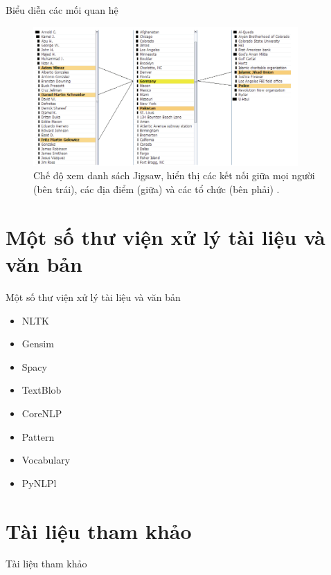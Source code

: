 \documentclass[10pt]{beamer}
\theoremstyle{remark}
\theoremstyle{definition}
\begin{document}
\begin{frame}{Biểu diễn các mối quan hệ}
	\begin{figure}[h!]
        \centering
        \includegraphics[width=0.9\textwidth]{20.png}
        \caption{Chế độ xem danh sách Jigsaw, hiển thị các kết nối giữa mọi người (bên trái), các địa điểm (giữa) và các tổ chức (bên phải) \cite{155}.}
        \label{fig:20}
    \end{figure}
\end{frame}

\section{Một số thư viện xử lý tài liệu và văn bản}

\begin{frame}{Một số thư viện xử lý tài liệu và văn bản}
	\begin{itemize}
		\item NLTK
		\item Gensim
		\item Spacy
		\item TextBlob
		\item CoreNLP
		\item Pattern
		\item Vocabulary
		\item PyNLPl
	\end{itemize}
\end{frame}

\section{Tài liệu tham khảo}
\begin{frame}[allowframebreaks]{Tài liệu tham khảo}
    \printbibliography
\end{frame}
\end{document}

